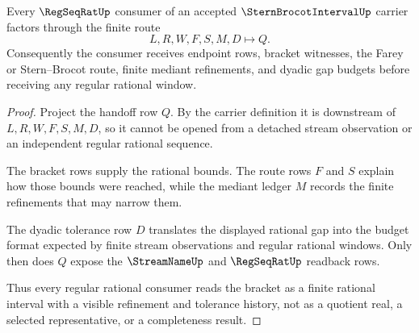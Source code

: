 \begin{theorem}
\label{thm:stern-brocot-interval-regseqrat-window-handoff}
Every $\RegSeqRatUp$ consumer of an accepted $\SternBrocotIntervalUp$ carrier factors through the finite route
$$
L,R,W,F,S,M,D \longmapsto Q .
$$
Consequently the consumer receives endpoint rows, bracket witnesses, the Farey or Stern--Brocot route, finite mediant refinements, and dyadic gap budgets before receiving any regular rational window.
\end{theorem}
\begin{proof}
Project the handoff row $Q$. By the carrier definition it is downstream of $L,R,W,F,S,M,D$, so it cannot be opened from a detached stream observation or an independent regular rational sequence.

The bracket rows supply the rational bounds. The route rows $F$ and $S$ explain how those bounds were reached, while the mediant ledger $M$ records the finite refinements that may narrow them.

The dyadic tolerance row $D$ translates the displayed rational gap into the budget format expected by finite stream observations and regular rational windows. Only then does $Q$ expose the $\StreamNameUp$ and $\RegSeqRatUp$ readback rows.

Thus every regular rational consumer reads the bracket as a finite rational interval with a visible refinement and tolerance history, not as a quotient real, a selected representative, or a completeness result.
\end{proof}

